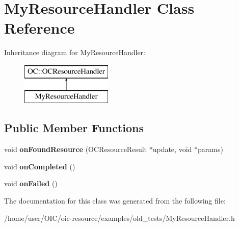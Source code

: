 \hypertarget{classMyResourceHandler}{}\section{My\+Resource\+Handler Class Reference}
\label{classMyResourceHandler}
Inheritance diagram for My\+Resource\+Handler\+:\begin{figure}[H]
\begin{center}
\leavevmode
\includegraphics[height=2.000000cm]{classMyResourceHandler}
\end{center}
\end{figure}
\subsection*{Public Member Functions}
\begin{DoxyCompactItemize}
\item 
\hypertarget{classMyResourceHandler_afa8bbbb138a0e1ba0b33d50597c06e24}{}void {\bfseries on\+Found\+Resource} (O\+C\+Resource\+Result $\ast$update, void $\ast$params)\label{classMyResourceHandler_afa8bbbb138a0e1ba0b33d50597c06e24}

\item 
\hypertarget{classMyResourceHandler_ae561787bcebe759437a7a00cc50433a4}{}void {\bfseries on\+Completed} ()\label{classMyResourceHandler_ae561787bcebe759437a7a00cc50433a4}

\item 
\hypertarget{classMyResourceHandler_a3ae345fd8ecd8f3c988187a04788f59f}{}void {\bfseries on\+Failed} ()\label{classMyResourceHandler_a3ae345fd8ecd8f3c988187a04788f59f}

\end{DoxyCompactItemize}


The documentation for this class was generated from the following file\+:\begin{DoxyCompactItemize}
\item 
/home/user/\+O\+I\+C/oic-\/resource/examples/old\+\_\+tests/My\+Resource\+Handler.\+h\end{DoxyCompactItemize}

